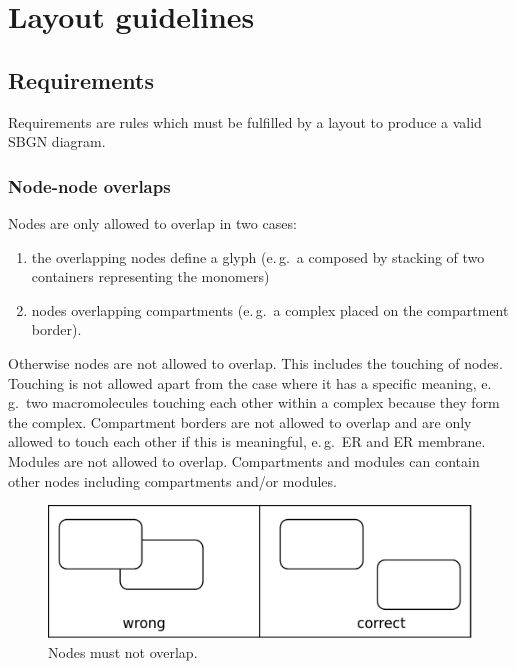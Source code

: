 \newpage

\section{Layout guidelines}

\subsection{Requirements}

Requirements are rules which must be fulfilled by a layout to
produce a valid SBGN diagram.

\subsubsection{Node-node overlaps}

Nodes are only allowed to overlap in two cases:
\begin{enumerate}
  \item the overlapping nodes define a glyph (e.\,g.~a 
  composed by stacking of two containers representing the monomers)
  \item nodes overlapping compartments
  (e.\,g.~a complex placed on the compartment border).
\end{enumerate}
Otherwise nodes are not allowed to overlap. This includes the
touching of nodes. Touching is not allowed apart from the case where
it has a specific meaning, e.\,g.~two macromolecules touching each
other within a complex because they form the complex. Compartment
borders are not allowed to overlap and are only allowed to touch
each other if this is meaningful, e.\,g.~ER and ER membrane. Modules
are not allowed to overlap. Compartments and modules can contain
other nodes including compartments and/or modules.

\begin{figure}[h!]
  \centering
  \includegraphics[scale=0.3]{images/layout-node-node}
  \caption{Nodes must not overlap.}\label{layout1}
\end{figure}

